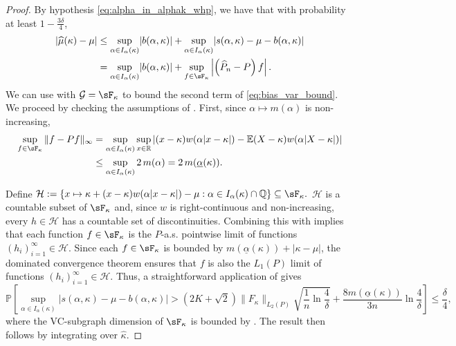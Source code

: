\documentclass{article}
\theoremstyle{plain}
\theoremstyle{definition}
\def\R{\mathbb{R}} %
\def\Q{\mathbb{Q}} %
\newcommand{\E}{\mathbb{E}} %
\newcommand{\Pmhat}{\widehat{P}}
\renewcommand{\Pr}{\mathbb{P}}
\def\sG{\mathcal{G}}\def\sH{\mathcal{H}}\def\sI{\mathcal{I}}
\begin{document}
\begin{appendix}
{\renewcommand{\proofname}{Proof of \Cref{theorem:bias_variance}}
	\begin{proof}
		By hypothesis \eqref{eq:alpha_in_alphak_whp}, we have that with probability at least \( 1-\frac{3\delta}{4} \), \begin{align}
      \lvert \widehat{\mu}(\kappa ) - \mu \rvert & \le \sup_{\alpha \in I_\alpha (\kappa )} \lvert  b(\alpha,\kappa )\rvert  + \sup_{\alpha \in I_\alpha (\kappa )}\lvert s(\alpha,\kappa ) - \mu - b(\alpha,\kappa ) \rvert \nonumber \\
                                                                   & =\sup_{\alpha \in I_\alpha (\kappa )} \lvert  b(\alpha,\kappa )\rvert  + \sup_{f \in \sF_\kappa } \left|\left(\Pmhat_n - P\right) f\right|.\label{eq:bias_var_bound}
		\end{align}
		We can use  with $\sG=\sF_\kappa $ to bound the second term of \eqref{eq:bias_var_bound}. We proceed by checking the assumptions of . First, since $\alpha \mapsto m(\alpha)$ is non-increasing,
		\begin{align*}
			\sup_{f \in \sF_\kappa } \| f - Pf \|_\infty & = \sup_{\alpha \in I_\alpha (\kappa )} \sup_{x \in \R} | (x-\kappa) w(\alpha |x-\kappa|) - \E (X-\kappa) w(\alpha |X-\kappa|) | \\
			                                     & \leq \sup_{\alpha \in I_\alpha (\kappa )} 2\, m(\alpha) =  2\,m(\underline{\alpha}(\kappa)).
		\end{align*}

		Define
		$\sH := \{ x \mapsto \kappa + (x-\kappa) w(\alpha |x-\kappa|) - \mu : \alpha \in I_\alpha(\kappa) \cap \Q \}\subseteq\sF_\kappa .$
		$\sH$ is a countable subset of $\sF_\kappa $ and, since $w$ is right-continuous and non-increasing, every \( h\in \sH \) has a countable set of discontinuities. Combining this with  implies that each function $f \in \sF_\kappa $ is the $P$-a.s. pointwise limit of functions $(h_i)_{i=1}^\infty \in \sH$. Since each $f \in \sF_\kappa $ is bounded by $ m(\underline{\alpha}(\kappa)) + \lvert \kappa -\mu  \rvert  $, the dominated convergence theorem ensures that $f$ is also the $L_1(P)$ limit of functions $(h_i)_{i=1}^\infty \in \sH$. Thus, a straightforward application of  gives
		\[
			\Pr\left[ \sup_{\alpha \in I_\alpha (\kappa )}\lvert s(\alpha,\kappa ) - \mu - b(\alpha,\kappa ) \rvert > \left(2K+\sqrt{2}\right) \| F_\kappa  \|_{L_2(P)}\sqrt{\frac{1}{n} \ln \frac{4}{\delta}}+\frac{8 m(\underline{\alpha}(\kappa))}{3n}\ln \frac{4}{\delta }  \right] \leq \frac{\delta}{4},
		\]
    where the VC-subgraph dimension of \( \sF_\kappa  \) is bounded by . The result then follows by integrating over \( \widehat{\kappa }  \).
	\end{proof}}


\end{appendix}
\end{document}
